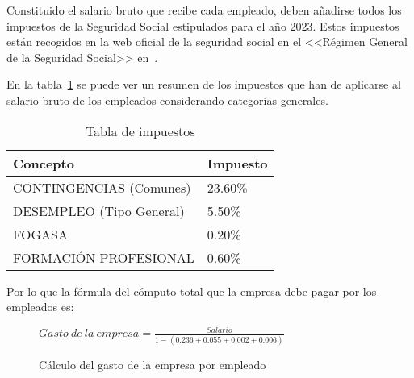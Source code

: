 Constituido el salario bruto que recibe cada empleado, deben añadirse todos los
impuestos de la Seguridad Social estipulados para el año 2023. Estos impuestos
están recogidos en la web oficial de la seguridad social en el <<Régimen General
de la Seguridad Social>> en~\cite{cotizacion2023}.

En la tabla~\ref{tabla:seg-social} se puede ver un resumen de los impuestos que
han de aplicarse al salario bruto de los empleados considerando categorías
generales.

\begin{table}[H]
    \centering
    \begin{tabular}{ll}
        \toprule
    \textbf{Concepto}  & \textbf{Impuesto} \\ \midrule
    CONTINGENCIAS   (Comunes)  & 23.60\% \\
    DESEMPLEO  (Tipo General) & 5.50\%  \\
    FOGASA                   & 0.20\%  \\
    FORMACIÓN PROFESIONAL      & 0.60\% 
    \end{tabular}%
    \caption{Tabla de impuestos}
    \label{tabla:seg-social}
\end{table}

Por lo que la fórmula del cómputo total que la empresa debe pagar por los
empleados es:

\begin{figure}[H]
\begin{center}
    $Gasto~de~la~empresa = \frac{Salario}{1-(0.236+0.055+0.002+0.006)}$
\end{center}
\caption{Cálculo del gasto de la empresa por empleado}
\end{figure}


\begin{table}[H]
\caption{Salarios brutos y coste que supone a la empresa}
\label{tabla:salarios}
\end{table}

